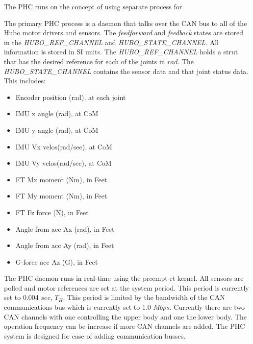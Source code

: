 The PHC runs on the concept of using separate process for 



The primary PHC process is a daemon that talks over the CAN bus to all of the Hubo motor drivers and sensors.  
The \textit{feedforward} and \textit{feedback} states are stored in the \textit{HUBO\_REF\_CHANNEL} and \textit{HUBO\_STATE\_CHANNEL}.  
All information is stored in SI units.  The \textit{HUBO\_REF\_CHANNEL} holds a strut that has the desired reference for each of the joints in $rad$.  
The \textit{HUBO\_STATE\_CHANNEL} contains the sensor data and that joint status data.  
This includes:

\begin{itemize}
                \item Encoder position (rad), at each joint
                \item IMU x angle (rad), at CoM
                \item IMU y angle (rad), at CoM
                \item IMU Vx velos(rad/sec), at CoM
                \item IMU Vy velos(rad/sec), at CoM
                \item FT Mx moment (Nm), in Feet
                \item FT My moment (Nm), in Feet
                \item FT Fz force (N), in Feet
                \item Angle from acc Ax (rad), in Feet
                \item Angle from acc Ay (rad), in Feet
                \item G-force acc Az (G), in Feet
\end{itemize}

The PHC daemon runs in real-time using the preempt-rt kernel.  
All sensors are polled and motor references are set at the system period.  
This period is currently set to 0.004 $sec$, $T_H$.  
This period is limited by the bandwidth of the CAN communications bus which is currently set to 1.0 $Mbps$.  
Currently there are two CAN channels with one controlling the upper body and one the lower body.  
The operation frequency can be increase if more CAN channels are added.  
The PHC system is designed for ease of adding communication busses.  

